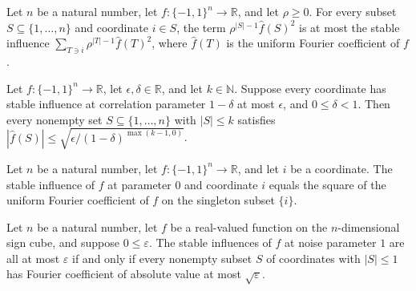 \begin{theorem}
\label{FABL.rho_pow_card_sub_one_mul_sq_fourierCoeff_le_stableInfluence}
\leanok
{}
Let $n$ be a natural number, let $f:\{−1,1\}^n\to\mathbb R$, and let $\rho\ge0$. For
every subset $S\subseteq\{1,\ldots,n\}$ and coordinate $i\in S$, the term
$\rho^{|S|-1}\widehat f(S)^2$ is at most the stable influence $\sum_{T\ni
i}\rho^{|T|-1}\widehat f(T)^2$, where $\widehat f(T)$ is the uniform Fourier coefficient
of $f$.
\end{theorem}

\begin{theorem}
\label{FABL.HasSmallStableInfluences.isLowDegreeFourierRegular}
\leanok
{}
Let $f:\{-1,1\}^n\to\mathbb R$, let $\epsilon,\delta\in\mathbb R$, and let $k\in\mathbb
N$. Suppose every coordinate has stable influence at correlation parameter $1-\delta$ at
most $\epsilon$, and $0\le\delta<1$. Then every nonempty set $S\subseteq\{1,\ldots,n\}$
with $|S|\le k$ satisfies $|\widehat f(S)|\le\sqrt{\epsilon/(1-\delta)^{\max(k-1,0)}}$.
\end{theorem}

\begin{theorem}
\label{FABL.stableInfluence_zero_eq_sq_fourierCoeff_singleton}
\leanok
{}
Let $n$ be a natural number, let $f:\{−1,1\}^n\to\mathbb R$, and let $i$ be a
coordinate. The stable influence of $f$ at parameter $0$ and coordinate $i$ equals the
square of the uniform Fourier coefficient of $f$ on the singleton subset $\{i\}$.
\end{theorem}

\begin{theorem}
\label{FABL.hasSmallStableInfluences_one_iff_isLowDegreeFourierRegular_one}
\leanok
{}
Let $n$ be a natural number, let $f$ be a real-valued function on the $n$-dimensional
sign cube, and suppose $0\leq\varepsilon$. The stable influences of $f$ at noise
parameter $1$ are all at most $\varepsilon$ if and only if every nonempty subset $S$ of
coordinates with $|S|\leq1$ has Fourier coefficient of absolute value at most
$\sqrt{\varepsilon}$.
\end{theorem}

